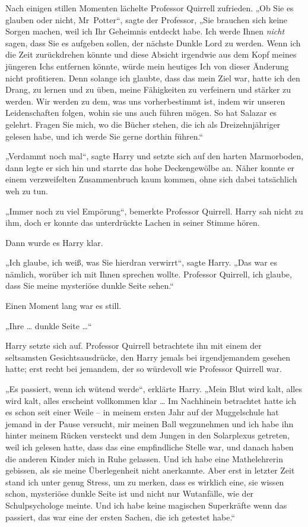 {Nach einigen stillen Momenten lächelte Professor Quirrell zufrieden. „Ob Sie es glauben oder nicht, Mr~Potter“, sagte der Professor, „Sie brauchen sich keine Sorgen machen, weil ich Ihr Geheimnis entdeckt habe. Ich werde Ihnen \emph{nicht} sagen, dass Sie es aufgeben sollen, der nächste Dunkle Lord zu werden. Wenn ich die Zeit zurückdrehen könnte und diese Absicht irgendwie aus dem Kopf meines jüngeren Ichs entfernen könnte, würde mein heutiges Ich von dieser Änderung nicht profitieren. Denn solange ich glaubte, dass das mein Ziel war, hatte ich den Drang, zu lernen und zu üben, meine Fähigkeiten zu verfeinern und stärker zu werden. Wir werden zu dem, was uns vorherbestimmt ist, indem wir unseren Leidenschaften folgen, wohin sie uns auch führen mögen. So hat Salazar es gelehrt. Fragen Sie mich, wo die Bücher stehen, die ich als Dreizehnjähriger gelesen habe, und ich werde Sie gerne dorthin führen.“

„Verdammt noch mal“, sagte Harry und setzte sich auf den harten Marmorboden, dann legte er sich hin und starrte das hohe Deckengewölbe an. Näher konnte er einem verzweifelten Zusammenbruch kaum kommen, ohne sich dabei tatsächlich weh zu tun.

„Immer noch zu viel Empörung“, bemerkte Professor Quirrell. Harry sah nicht zu ihm, doch er konnte das unterdrückte Lachen in seiner Stimme hören.

Dann wurde es Harry klar.

„Ich glaube, ich weiß, was Sie hierdran verwirrt“, sagte Harry. „Das war es nämlich, worüber ich mit Ihnen sprechen wollte. Professor Quirrell, ich glaube, dass Sie meine mysteriöse dunkle Seite sehen.“

Einen Moment lang war es still.

„Ihre … dunkle Seite …“

Harry setzte sich auf. Professor Quirrell betrachtete ihn mit einem der seltsamsten Gesichtsausdrücke, den Harry jemals bei irgendjemandem gesehen hatte; erst recht bei jemandem, der so würdevoll wie Professor Quirrell war.

„Es passiert, wenn ich wütend werde“, erklärte Harry. „Mein Blut wird kalt, alles wird kalt, alles erscheint vollkommen klar … Im Nachhinein betrachtet hatte ich es schon seit einer Weile -- in meinem ersten Jahr auf der Muggelschule hat jemand in der Pause versucht, mir meinen Ball wegzunehmen und ich habe ihn hinter meinem Rücken versteckt und dem Jungen in den Solarplexus getreten, weil ich gelesen hatte, dass das eine empfindliche Stelle war, und danach haben die anderen Kinder mich in Ruhe gelassen. Und ich habe eine Mathelehrerin gebissen, als sie meine Überlegenheit nicht anerkannte. Aber erst in letzter Zeit stand ich unter genug Stress, um zu merken, dass es wirklich eine, sie wissen schon, mysteriöse dunkle Seite ist und nicht nur Wutanfälle, wie der Schulpsychologe meinte. Und ich habe keine magischen Superkräfte wenn das passiert, das war eine der ersten Sachen, die ich getestet habe.“

}

